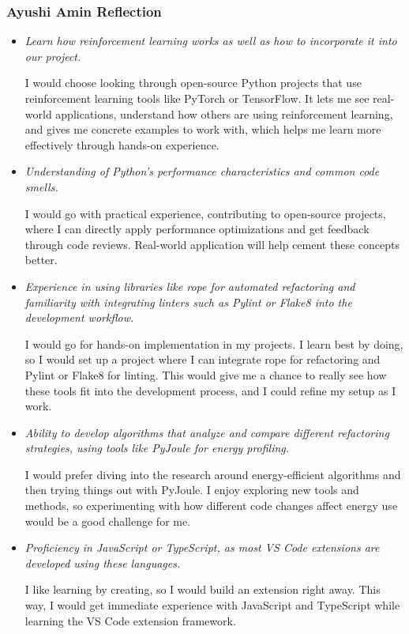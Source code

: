 \documentclass[12pt]{article}
\begin{document}
\subsubsection*{Ayushi Amin Reflection}

\medskip

\begin{itemize}[label={}, wide=0pt, leftmargin=*]

  \item \textit{Learn how reinforcement learning works as well as how to incorporate it into our project.}
  
  I would choose looking through open-source Python projects that use reinforcement learning tools like PyTorch or TensorFlow. It lets me see real-world applications, understand how others are using reinforcement learning, and gives me concrete examples to work with, which helps me learn more effectively through hands-on experience.
      
  \item \textit{Understanding of Python's performance characteristics and common code smells.}
  
  I would go with practical experience, contributing to open-source projects, where I can directly apply performance optimizations and get feedback through code reviews. Real-world application will help cement these concepts better.
      
  \item \textit{Experience in using libraries like rope for automated refactoring and familiarity with integrating linters such as Pylint or Flake8 into the development workflow.} 
  
  I would go for hands-on implementation in my projects. I learn best by doing, so I would set up a project where I can integrate rope for refactoring and Pylint or Flake8 for linting. This would give me a chance to really see how these tools fit into the development process, and I could refine my setup as I work.
      
  \item \textit{Ability to develop algorithms that analyze and compare different refactoring strategies, using tools like PyJoule for energy profiling.}
  
  I would prefer diving into the research around energy-efficient algorithms and then trying things out with PyJoule. I enjoy exploring new tools and methods, so experimenting with how different code changes affect energy use would be a good challenge for me.

  \item \textit{Proficiency in JavaScript or TypeScript, as most VS Code extensions are developed using these languages.}

  I like learning by creating, so I would build an extension right away. This way, I would get immediate experience with JavaScript and TypeScript while learning the VS Code extension framework.

\end{itemize}
\end{document}
